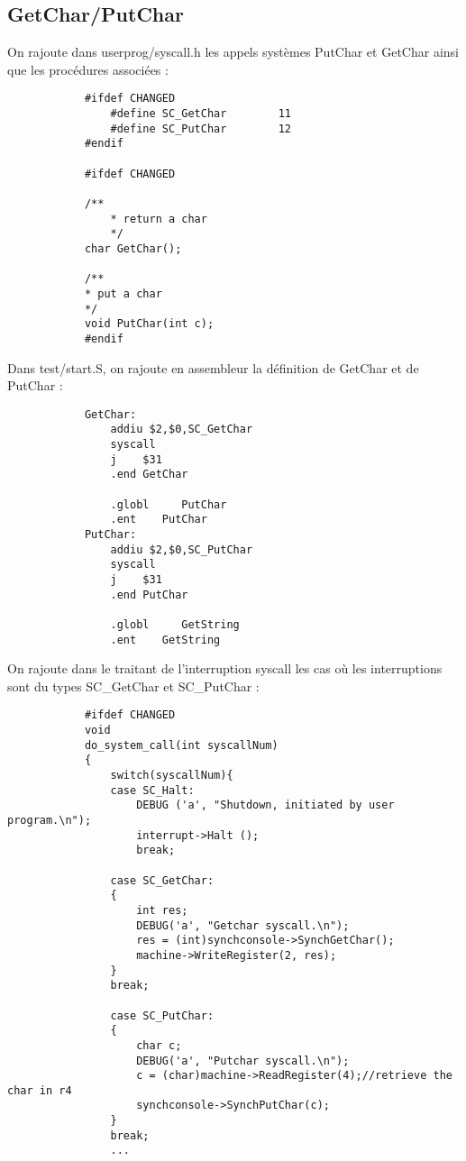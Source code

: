 \documentclass[a4paper,10pt]{article}
\begin{document}
    \subsection{GetChar/PutChar}
        On rajoute dans userprog/syscall.h les appels systèmes PutChar et GetChar ainsi que les procédures associées :
        \begin{lstlisting}
            #ifdef CHANGED
                #define SC_GetChar        11
                #define SC_PutChar        12
            #endif

            #ifdef CHANGED

            /**
                * return a char
                */
            char GetChar();

            /**
            * put a char
            */
            void PutChar(int c);
            #endif
        \end{lstlisting}
        Dans test/start.S, on rajoute en assembleur la définition de GetChar et de PutChar :
        \begin{lstlisting}
            GetChar:
                addiu $2,$0,SC_GetChar
                syscall
                j    $31
                .end GetChar

                .globl     PutChar
                .ent    PutChar
            PutChar:
                addiu $2,$0,SC_PutChar
                syscall
                j    $31
                .end PutChar

                .globl     GetString
                .ent    GetString
        \end{lstlisting}
        On rajoute dans le traitant de l'interruption syscall les cas où les interruptions sont du types SC\_GetChar et SC\_PutChar :
        \begin{lstlisting}
            #ifdef CHANGED
            void
            do_system_call(int syscallNum)
            {
                switch(syscallNum){
                case SC_Halt:
                    DEBUG ('a', "Shutdown, initiated by user program.\n");
                    interrupt->Halt ();
                    break;

                case SC_GetChar:
                {
                    int res;
                    DEBUG('a', "Getchar syscall.\n");
                    res = (int)synchconsole->SynchGetChar();
                    machine->WriteRegister(2, res);
                }
                break;

                case SC_PutChar:
                {
                    char c;
                    DEBUG('a', "Putchar syscall.\n");
                    c = (char)machine->ReadRegister(4);//retrieve the char in r4
                    synchconsole->SynchPutChar(c);
                }
                break;
                ...
        \end{lstlisting}
\end{document}
